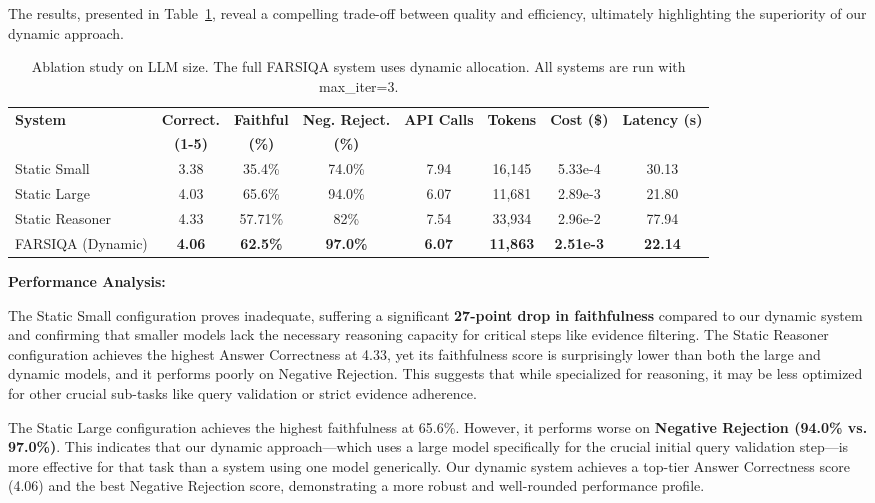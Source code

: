 \documentclass[11pt]{article}
\begin{document}
The results, presented in Table~\ref{tab:llm-ablation}, reveal a compelling trade-off between quality and efficiency, ultimately highlighting the superiority of our dynamic approach.

\begin{table}[t]
\centering
\scriptsize
\begin{tabular}{lccccccc}
\hline
\textbf{System} & \textbf{Correct.} & \textbf{Faithful} & \textbf{Neg. Reject.} & \textbf{API Calls} & \textbf{Tokens} & \textbf{Cost (\$)} & \textbf{Latency (s)} \\
& \textbf{(1-5)} & \textbf{(\%)} & \textbf{(\%)} & & & & \\
\hline
Static Small & 3.38 & 35.4\% & 74.0\% & 7.94 & 16,145 & 5.33e-4 & 30.13 \\
Static Large & 4.03 & 65.6\% & 94.0\% & 6.07 & 11,681 & 2.89e-3 & 21.80 \\
Static Reasoner & 4.33 & 57.71\% & 82\% & 7.54 & 33,934 & 2.96e-2 & 77.94 \\
FARSIQA (Dynamic) & \textbf{4.06} & \textbf{62.5\%} & \textbf{97.0\%} & \textbf{6.07} & \textbf{11,863} & \textbf{2.51e-3} & \textbf{22.14} \\
\hline
\end{tabular}
\caption{Ablation study on LLM size. The full FARSIQA system uses dynamic allocation. All systems are run with max\_iter=3.}
\label{tab:llm-ablation}
\end{table}

\textbf{Performance Analysis:}

The Static Small configuration proves inadequate, suffering a significant \textbf{27-point drop in faithfulness} compared to our dynamic system and confirming that smaller models lack the necessary reasoning capacity for critical steps like evidence filtering. The Static Reasoner configuration achieves the highest Answer Correctness at 4.33, yet its faithfulness score is surprisingly lower than both the large and dynamic models, and it performs poorly on Negative Rejection. This suggests that while specialized for reasoning, it may be less optimized for other crucial sub-tasks like query validation or strict evidence adherence.

The Static Large configuration achieves the highest faithfulness at 65.6\%. However, it performs worse on \textbf{Negative Rejection (94.0\% vs. 97.0\%)}. This indicates that our dynamic approach---which uses a large model specifically for the crucial initial query validation step---is more effective for that task than a system using one model generically. Our dynamic system achieves a top-tier Answer Correctness score (4.06) and the best Negative Rejection score, demonstrating a more robust and well-rounded performance profile.
\end{document}

